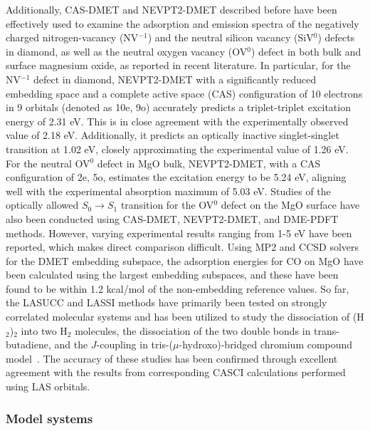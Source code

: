 Additionally, CAS-DMET and NEVPT2-DMET described before have been effectively used to examine the adsorption and emission spectra of the negatively charged nitrogen-vacancy (NV$^{-1}$) and the neutral silicon vacancy (SiV$^{0}$) defects in diamond, as well as the neutral oxygen vacancy (OV$^{0}$) defect in both bulk and surface magnesium oxide, as reported in recent literature. \cite{mitra2021excited,haldar2023local,Verma2023} In particular, for the NV$^{-1}$ defect in diamond, NEVPT2-DMET with a significantly reduced embedding space and a complete active space (CAS) configuration of 10 electrons in 9 orbitals (denoted as 10e, 9o) accurately predicts a triplet-triplet excitation energy of 2.31 eV. This is in close agreement with the experimentally observed value of 2.18 eV. Additionally, it predicts an optically inactive singlet-singlet transition at 1.02 eV, closely approximating the experimental value of 1.26 eV. For the neutral OV$^{0}$ defect in MgO bulk, NEVPT2-DMET, with a CAS configuration of 2e, 5o, estimates the excitation energy to be 5.24 eV, aligning well with the experimental absorption maximum of 5.03 eV. Studies of the optically allowed $S_0\rightarrow S_1$ transition for the OV$^{0}$ defect on the MgO surface have also been conducted using CAS-DMET, NEVPT2-DMET, and DME-PDFT methods. However, varying experimental results ranging from 1-5 eV have been reported, which makes direct comparison difficult. Using MP2 and CCSD solvers for the DMET embedding subspace, the adsorption energies for CO on MgO have been calculated using the largest embedding subspaces, and these have been found to be within 1.2 kcal/mol of the non-embedding reference values. \cite{Mitra2022} So far, the LASUCC and LASSI methods have primarily been tested on strongly correlated molecular systems and has been utilized to study the dissociation of (H$_2$)$_2$ into two H$_2$ molecules, the dissociation of the two double bonds in trans-butadiene, and the $J$-coupling in tris-(\(\mu\)-hydroxo)-bridged chromium compound model~\cite{Pandharkar2022,Otten2022}. The accuracy of these studies has been confirmed through excellent agreement with the results from corresponding CASCI calculations performed using LAS orbitals.

\subsubsection{Model systems}

